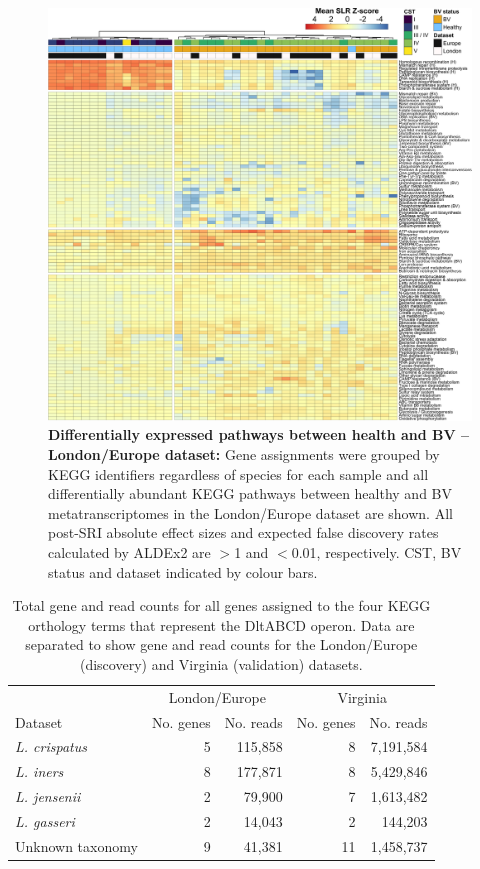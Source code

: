 \documentclass[sn-mathphys,Numbered]{sn-jnl}%
\begin{document}
\begin{figure}[H]
    \centering
    \includegraphics[scale = 0.8125]{0_supplFig2_revised.png}
    \caption{\textbf{Differentially expressed pathways between health and BV --London/Europe dataset:} Gene assignments were grouped by KEGG identifiers regardless of species for each sample and all differentially abundant KEGG pathways between healthy and BV metatranscriptomes in the London/Europe dataset are shown. All post-SRI absolute effect sizes and expected false discovery rates calculated by ALDEx2 are $>$1 and $<$0.01, respectively. CST, BV status and dataset indicated by colour bars.} \label{fig:sfigDifAbLonEurAll}
\end{figure}
\newpage

\begin{table}[h]
    \centering
    \caption{Total gene and read counts for all genes assigned to the four KEGG orthology terms that represent the DltABCD operon. Data are separated to show gene and read counts for the London/Europe (discovery) and Virginia (validation) datasets.} \label{tab:tabDltGenes}
    \begin{tabular}{lrrrr}
        \toprule
        & \multicolumn{2}{c}{London/Europe} & \multicolumn{2}{c}{Virginia}\\
        \cmidrule(lr){2-3} \cmidrule(lr){4-5}
        Dataset & No. genes & No. reads & No. genes & No. reads\\
        \midrule
        \textit{L. crispatus} & 5 & 115,858 & 8 & 7,191,584\\
        \textit{L. iners} & 8 & 177,871 & 8 & 5,429,846\\
        \textit{L. jensenii} & 2 & 79,900 & 7 & 1,613,482\\
        \textit{L. gasseri} & 2 & 14,043 & 2 & 144,203\\
        Unknown taxonomy & 9 & 41,381 & 11 & 1,458,737\\
        \bottomrule
    \end{tabular}
\end{table}
\newpage
\end{document}
